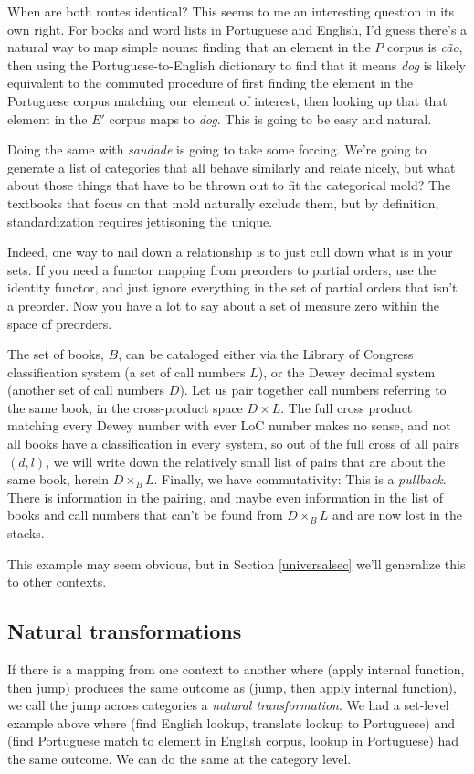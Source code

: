\documentclass[11pt]{article}
\begin{document}
When are both routes identical? This seems to me an interesting question in its own right.
For books and word lists in Portuguese and English, I'd guess there's a natural
way to map simple nouns: finding that an element in the $P$ corpus is {\em cão},
then using the Portuguese-to-English dictionary to find that it means {\em dog}
is likely equivalent to the commuted procedure of first finding the element in the
Portuguese corpus matching our element of interest, then looking up that that element in
the $E'$ corpus maps to {\em dog}. This is going to be easy and natural.

Doing the same with {\em saudade} is going to take some forcing.
We're going to generate a list of
categories that all behave similarly and relate nicely, but what about those things
that have to be thrown out to fit the categorical mold? The textbooks that focus on
that mold naturally exclude them, but by definition, standardization requires jettisoning 
the unique.

Indeed, one way to nail down a relationship is to just cull down what is in your sets.
If you need a functor mapping from preorders to partial orders, use the identity functor,
and just ignore everything in the set of partial orders that isn't a preorder. Now you
have a lot to say about a set of measure zero within the space of preorders.

The set of books, $B$, can be cataloged either via the Library of Congress classification system
(a set of call numbers $L$), or the Dewey decimal system (another set of call numbers
$D$). Let us pair together call numbers referring to the same book, in the cross-product
space $D\times L$. The full cross product matching every Dewey number with ever LoC
number makes no sense, and not all books have a classification in every system,
so out of the full cross of all pairs $(d, l)$, we will write down the relatively
small list of pairs that are about the same book, herein $D\times_B L$.  Finally,
we have commutativity:
This is a {\em pullback}. There is information in the pairing, and maybe even
information in the list of books and call numbers that can't be found from $D\times_B L$
and are now lost in the stacks.

This example may seem obvious, but in Section \ref{universalsec} we'll generalize this
to other contexts.

\subsection{Natural transformations}
If there is a mapping from one context to another where (apply internal function,
then jump) produces the same outcome as (jump, then apply internal function), we call
the jump across categories a {\em natural transformation}. We had a set-level example
above where (find English lookup, translate lookup to Portuguese) and (find Portuguese
match to element in English corpus, lookup in Portuguese) had the same outcome. We can do
the same at the category level.
\end{document}
